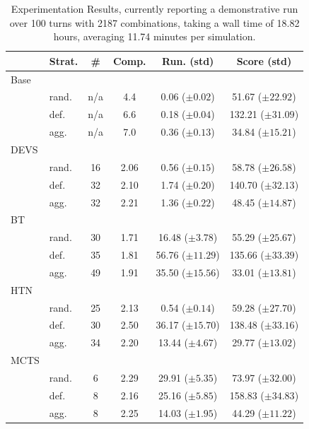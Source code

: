 \begin{table}[t]
    \centering
    \caption{
        Experimentation Results, currently reporting a demonstrative run 
        over 100 turns with 2187 combinations, taking a wall time of 18.82 hours, 
        averaging 11.74 minutes per simulation.
    }
    \label{tab:eval:results}
    \begin{tabular}{ll|cccc}
        \toprule 
         & Strat. & \# & Comp. & Run. (std) & Score (std)  \\
        \midrule
        Base & \\
             & rand.  & n/a & 4.4 & 0.06 ($\pm{}0.02$) & 51.67 ($\pm{}22.92$) \\ 
             & def.   & n/a & 6.6 & 0.18 ($\pm{}0.04$) & 132.21 ($\pm{}31.09$) \\ 
             & agg.   & n/a & 7.0 & 0.36 ($\pm{}0.13$) & 34.84 ($\pm{}15.21$) \\ 
        DEVS & \\
             & rand.  & 16 & 2.06 & 0.56 ($\pm{}0.15$) & 58.78 ($\pm{}26.58$) \\ 
             & def.   & 32 & 2.10 & 1.74 ($\pm{}0.20$) & 140.70 ($\pm{}32.13$) \\ 
             & agg.   & 32 & 2.21 & 1.36 ($\pm{}0.22$) & 48.45 ($\pm{}14.87$) \\ 
        BT  &  \\
             & rand.  & 30 & 1.71 & 16.48 ($\pm{}3.78$) & 55.29 ($\pm{}25.67$) \\ 
             & def.   & 35 & 1.81 & 56.76 ($\pm{}11.29$) & 135.66 ($\pm{}33.39$) \\ 
             & agg.   & 49 & 1.91 & 35.50 ($\pm{}15.56$) & 33.01 ($\pm{}13.81$) \\ 
        HTN & \\
             & rand.  & 25 & 2.13 & 0.54 ($\pm{}0.14$) & 59.28 ($\pm{}27.70$) \\ 
             & def.   & 30 & 2.50 & 36.17 ($\pm{}15.70$) & 138.48 ($\pm{}33.16$) \\ 
             & agg.   & 34 & 2.20 & 13.44 ($\pm{}4.67$) & 29.77 ($\pm{}13.02$) \\ 
        MCTS & \\
             & rand.  & 6 & 2.29 & 29.91 ($\pm{}5.35$) & 73.97 ($\pm{}32.00$) \\ 
             & def.   & 8 & 2.16 & 25.16 ($\pm{}5.85$) & 158.83 ($\pm{}34.83$) \\ 
             & agg.   & 8 & 2.25 & 14.03 ($\pm{}1.95$) & 44.29 ($\pm{}11.22$) \\ 

\end{tabular}
\end{table}
